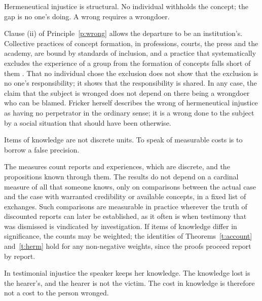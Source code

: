 \documentclass{situationist-preprint}
\begin{document}
\begin{objection}[No perpetrator]\label{o:structural}
Hermeneutical injustice is structural. No individual withholds the concept; the gap is no one's doing. A wrong requires a wrongdoer.
\end{objection}

\begin{reply}
Clause (ii) of Principle~\ref{p:wrong} allows the departure to be an institution's. Collective practices of concept formation, in professions, courts, the press and the academy, are bound by standards of inclusion, and a practice that systematically excludes the experience of a group from the formation of concepts falls short of them \citep{Anderson2012}. That no individual chose the exclusion does not show that the exclusion is no one's responsibility; it shows that the responsibility is shared. In any case, the claim that the subject is wronged does not depend on there being a wrongdoer who can be blamed. Fricker herself describes the wrong of hermeneutical injustice as having no perpetrator in the ordinary sense; it is a wrong done to the subject by a social situation that should have been otherwise.
\end{reply}

\begin{objection}\label{o:count}
Items of knowledge are not discrete units. To speak of measurable costs is to borrow a false precision.
\end{objection}

\begin{reply}
The measures count reports and experiences, which are discrete, and the propositions known through them. The results do not depend on a cardinal measure of all that someone knows, only on comparisons between the actual case and the case with warranted credibility or available concepts, in a fixed list of exchanges. Such comparisons are measurable in practice wherever the truth of discounted reports can later be established, as it often is when testimony that was dismissed is vindicated by investigation. If items of knowledge differ in significance, the counts may be weighted; the identities of Theorems~\ref{t:account} and~\ref{t:herm} hold for any non-negative weights, since the proofs proceed report by report.
\end{reply}

\begin{objection}\label{o:speaker}
In testimonial injustice the speaker keeps her knowledge. The knowledge lost is the hearer's, and the hearer is not the victim. The cost in knowledge is therefore not a cost to the person wronged.
\end{objection}
\end{document}
